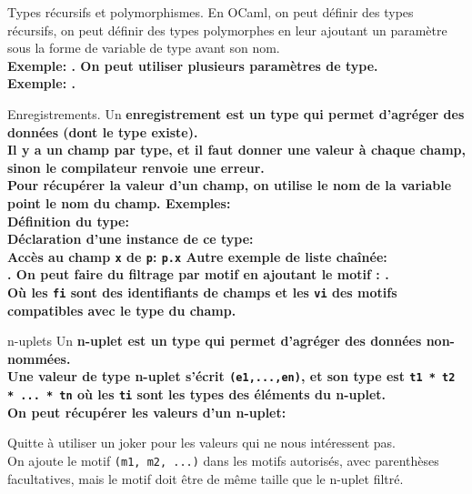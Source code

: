\documentclass[french, 11pt]{article}
\begin{document}
\begin{defi}{Types récursifs et polymorphismes.}{}
    En OCaml, on peut définir des types récursifs, on peut définir des types polymorphes en leur ajoutant un paramètre sous la forme de variable de type avant son nom.\\
    \bf{Exemple:} .\n
    On peut utiliser plusieurs paramètres de type.\\
    \bf{Exemple:} .
\end{defi}

\begin{defi}{Enregistrements.}{}
    Un \bf{enregistrement} est un type qui permet d'agréger des données (dont le type existe).\\
    Il y a un champ par type, et il faut donner une valeur à chaque champ, sinon le compilateur renvoie une erreur.\\
    Pour récupérer la valeur d'un champ, on utilise le nom de la variable point le nom du champ.\n
    \bf{Exemples:}\\
    Définition du type: \\
    Déclaration d'une instance de ce type: \\
    Accès au champ \texttt{x} de \texttt{p}: \texttt{p.x}\n
    Autre exemple de liste chaînée:\\
    .\n
    On peut faire du filtrage par motif en ajoutant le motif : .\\
    Où les \texttt{fi} sont des identifiants de champs et les \texttt{vi} des motifs compatibles avec le type du champ.

\end{defi}


\begin{defi}{n-uplets}{}
    Un \bf{n-uplet} est un type qui permet d'agréger des données non-nommées.\\
    Une valeur de type n-uplet s'écrit \texttt{(e1,...,en)}, et son type est \texttt{t1 * t2 * ... * tn} où les \texttt{ti} sont les types des éléments du n-uplet.\\
    On peut récupérer les valeurs d'un n-uplet:
    \begin{center}
    \end{center}
    Quitte à utiliser un joker pour les valeurs qui ne nous intéressent pas.\\
    On ajoute le motif \texttt{(m1, m2, ...)} dans les motifs autorisés, avec parenthèses facultatives, mais le motif doit être de même taille que le n-uplet filtré.
\end{defi}
\end{document}
